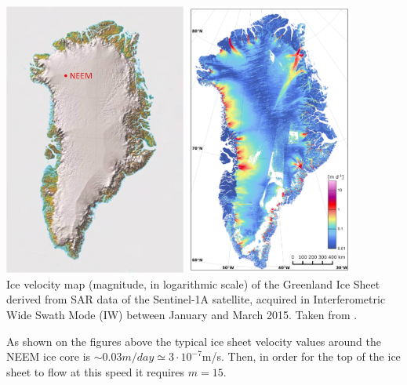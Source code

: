 \begin{center}
\includegraphics[height=9cm]{python_codes/fieldstone_59/images/neem}
\includegraphics[height=9cm]{python_codes/fieldstone_59/images/narh15}\\
{\captionfont Ice velocity map (magnitude, in logarithmic scale) of the Greenland Ice Sheet
derived from SAR data of the Sentinel-1A satellite, acquired in Interferometric Wide Swath
Mode (IW) between January and March 2015. Taken from \cite{narh15}.}
\end{center}

As shown on the figures above the typical ice sheet velocity values around the NEEM ice core 
is $\sim 0.03m/day \simeq 3\cdot 10^{-7}$m/s. 
Then, in order for the top of the ice sheet to flow at this speed it requires $m=15$.

